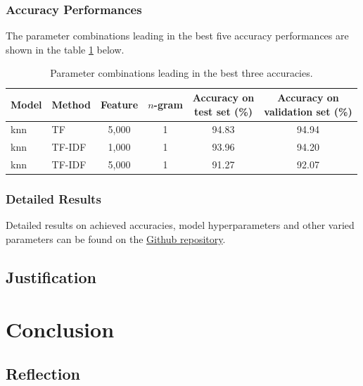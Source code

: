 \documentclass[a4paper,12pt,nottoc]{article}
\begin{document}
\subsubsection{Accuracy Performances}

The parameter combinations leading in the best five accuracy performances are shown in the table \ref{tab:accperf} below.

\begin{table}[h]
\begin{center}
\begin{tabular}{| l | l | c | c | c | c |}
\hline
Model & Method & Feature & $n$-gram & \thead{Accuracy on \\ test set (\%)} & \thead{Accuracy on \\ validation set (\%)} \\
\hline
knn & TF & 5,000 & 1 & 94.83 & 94.94 \\
knn & TF-IDF & 1,000 & 1 & 93.96 & 94.20 \\
knn & TF-IDF & 5,000 & 1 & 91.27 & 92.07	 \\
\hline 
\end{tabular}
\end{center}
\caption{Parameter combinations leading in the best three accuracies.}\label{tab:accperf}
\end{table}

\subsubsection{Detailed Results}

Detailed results on achieved accuracies, model hyperparameters and other varied parameters can be found on the \href{https://github.com/benjaminperucco/udacity-nano-mle/blob/master/5%20Capstone/2%20Project/3_postprocessing.ipynb}{Github repository}. 

\subsection{Justification}




\section{Conclusion}

\subsection{Reflection}\label{chap:reflection}
\end{document}
